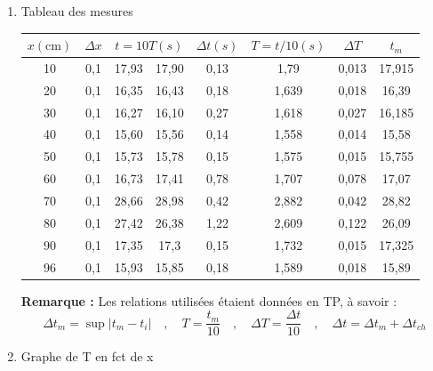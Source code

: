 \documentclass[a4paper,12pt]{article}
\begin{document}
\begin{enumerate}
    \item Tableau des mesures 
\begin{table}[H]
    \centering
    \renewcommand{\arraystretch}{1.4}
    \begin{tabular}{|c|c|c|c|c|c|c|c|}
    \hline
    $x (\text{cm})$ & $\Delta x$ & \multicolumn{2}{c|}{$t = 10T (s)$} & $\Delta t (s)$ & $T = t/10 (s)$ & $\Delta T$ & $t_m$ \\
    \hline
    10 & 0,1 & 17,93 & 17,90 & 0,13 & 1,79 & 0,013 & 17,915 \\
    \hline
    20 & 0,1 & 16,35 & 16,43 & 0,18 & 1,639 & 0,018 & 16,39 \\
    \hline
    30 & 0,1 & 16,27 & 16,10 & 0,27 & 1,618 & 0,027 & 16,185 \\
    \hline
    40 & 0,1 & 15,60 & 15,56 & 0,14 & 1,558 & 0,014 & 15,58 \\
    \hline
    50 & 0,1 & 15,73 & 15,78 & 0,15 & 1,575 & 0,015 & 15,755 \\
    \hline
    60 & 0,1 & 16,73 & 17,41 & 0,78 & 1,707 & 0,078 & 17,07 \\
    \hline
    70 & 0,1 & 28,66 & 28,98 & 0,42 & 2,882 & 0,042 & 28,82 \\
    \hline
    80 & 0,1 & 27,42 & 26,38 & 1,22 & 2,609 & 0,122 & 26,09 \\
    \hline
    90 & 0,1 & 17,35 & 17,3 & 0,15 & 1,732 & 0,015 & 17,325 \\
    \hline
    96 & 0,1 & 15,93 & 15,85 & 0,18 & 1,589 & 0,018 & 15,89 \\
    \hline
    \end{tabular}
\end{table}

\noindent \textbf{Remarque :} Les relations utilisées étaient données en TP, à savoir :
\[ \Delta t_m = \sup|t_m - t_i| \quad , \quad T = \frac{t_m}{10} \quad , \quad \Delta T = \frac{\Delta t}{10} \quad , \quad \Delta t = \Delta t_m + \Delta t_{ch} \]

    \item Graphe de T en fct de x


\end{enumerate}
\end{document}
